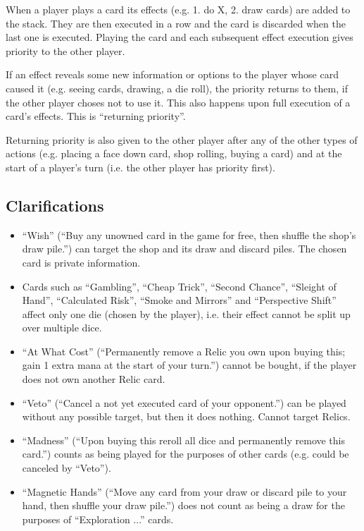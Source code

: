\documentclass[dvipsnames,parskip,a4paper]{scrartcl}
\begin{document}
\vspace{4pt}

When a player plays a card its effects (e.g. 1. do X, 2. draw cards) are added to the stack. They are then executed in a row and the card is discarded when the last one is executed. Playing the card and each subsequent effect execution gives priority to the other player.

\vspace{4pt}

If an effect reveals some new information or options to the player whose card caused it (e.g. seeing cards, drawing, a die roll), the priority returns to them, if the other player choses not to use it. This also happens upon full execution of a card's effects. This is ``returning priority''.

\vspace{4pt}

Returning priority is also given to the other player after any of the other types of actions (e.g. placing a face down card, shop rolling, buying a card) and at the start of a player's turn (i.e. the other player has priority first).

\subsection*{Clarifications}

\begin{itemize}
\item ``Wish'' (``Buy any unowned card in the game for free, then shuffle the shop's draw pile.'') can target the shop and its draw and discard piles. The chosen card is private information.
\item Cards such as ``Gambling'', ``Cheap Trick'', ``Second Chance'', ``Sleight of Hand'', ``Calculated Risk'', ``Smoke and Mirrors'' and ``Perspective Shift'' affect only one die (chosen by the player), i.e. their effect cannot be split up over multiple dice.
\item ``At What Cost'' (``Permanently remove a Relic you own upon buying this; gain 1 extra mana at the start of your turn.'') cannot be bought, if the player does not own another Relic card.
\item ``Veto'' (``Cancel a not yet executed card of your opponent.'') can be played without any possible target, but then it does nothing. Cannot target Relics.
\item ``Madness'' (``Upon buying this reroll all dice and permanently remove this card.'') counts as being played for the purposes of other cards (e.g. could be canceled by ``Veto''). 
\item ``Magnetic Hands'' (``Move any card from your draw or discard pile to your hand, then shuffle your draw pile.'') does not count as being a draw for the purposes of ``Exploration ...'' cards.
\end{itemize}
\end{document}
